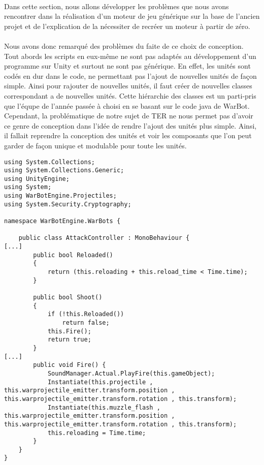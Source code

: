 \documentclass{report}
\begin{document}
\paragraph{} Dans cette section, nous allons développer les problèmes que nous avons rencontrer dans la réalisation d'un moteur de jeu générique sur la base de l'ancien projet et de l'explication de la nécessiter de recréer un moteur à partir de zéro.
\paragraph{} Nous avons donc remarqué des problèmes du faite de ce choix de conception. Tout abords les scripts en eux-même ne sont pas adaptés au développement d'un programme sur Unity et surtout ne sont pas générique.  En effet, les unités sont codés en dur dans le code, ne permettant pas l'ajout de nouvelles unités de façon simple. Ainsi pour rajouter de nouvelles unités, il faut créer de nouvelles classes correspondant a de nouvelles unités. Cette hiérarchie des classes est un parti-pris que l'équpe de l'année passée à choisi en se basant sur le code java de WarBot. Cependant, la problématique de notre sujet de TER ne nous permet pas d'avoir ce genre de conception dans l'idée de rendre l'ajout des unités plus simple. Ainsi, il fallait reprendre la conception des unités et voir les composants que l'on peut garder de façon unique et modulable pour toute les unités.
\begin{lstlisting}[language={[Sharp]C}, caption= Code du script AttackController.cs de l'ancien projet]
using System.Collections;
using System.Collections.Generic;
using UnityEngine;
using System;
using WarBotEngine.Projectiles;
using System.Security.Cryptography;

namespace WarBotEngine.WarBots {

    public class AttackController : MonoBehaviour {
[...]
        public bool Reloaded()
        {
            return (this.reloading + this.reload_time < Time.time);
        }

        public bool Shoot()
        {
            if (!this.Reloaded())
                return false;
            this.Fire();
            return true;
        }
[...]
        public void Fire() {
            SoundManager.Actual.PlayFire(this.gameObject);
            Instantiate(this.projectile , this.warprojectile_emitter.transform.position , this.warprojectile_emitter.transform.rotation , this.transform);
            Instantiate(this.muzzle_flash , this.warprojectile_emitter.transform.position , this.warprojectile_emitter.transform.rotation , this.transform);
            this.reloading = Time.time;
        }
    }
}
\end{lstlisting}
\end{document}
